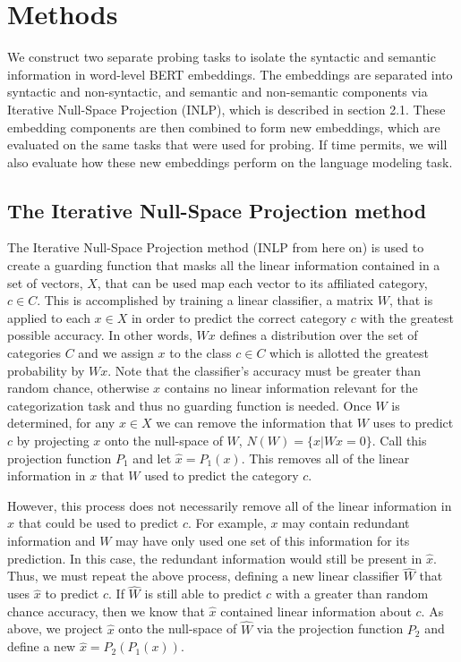 \documentclass[11pt,a4paper]{article}
\begin{document}
\section{Methods}
\label{sec:method}

We construct two separate probing tasks to isolate the syntactic and semantic information in word-level BERT embeddings\citep{bert}. The embeddings are separated into syntactic and non-syntactic, and semantic and non-semantic components via Iterative Null-Space Projection (INLP), which is described in section 2.1. These embedding components are then combined to form new embeddings, which are evaluated on the same tasks that were used for probing. If time permits, we will also evaluate how these new embeddings perform on the language modeling task. 

\subsection{The Iterative Null-Space Projection method}

The Iterative Null-Space Projection method (INLP from here on) is used to create a guarding function that masks all the linear information contained in a set of vectors, $X$, that can be used map each vector to its affiliated category, $c \in C$. This is accomplished by training a linear classifier, a matrix $W$, that is applied to each $x \in X$ in order to predict the correct category $c$ with the greatest possible accuracy. In other words, $Wx$ defines a distribution over the set of categories $C$ and we assign $x$ to the class $c \in C$ which is allotted the greatest probability by $Wx$. Note that the classifier's accuracy must be greater than random chance, otherwise $x$ contains no linear information relevant for the categorization task and thus no guarding function is needed. Once $W$ is determined, for any $x \in X$ we can remove the information that $W$ uses to predict $c$ by projecting $x$ onto the null-space of $W$, $N(W) = \{x | Wx=0\}$. Call this projection function $P_1$ and let $\hat{x} = P_1(x)$. This removes all of the linear information in $x$ that $W$ used to predict the category $c$. 

However, this process does not necessarily remove all of the linear information in $x$ that could be used to predict $c$. For example, $x$ may contain redundant information and $W$ may have only used one set of this information for its prediction. In this case, the redundant information would still be present in $\hat{x}$. Thus, we must repeat the above process, defining a new linear classifier $\hat{W}$ that uses $\hat{x}$  to predict $c$. If $\hat{W}$ is still able to predict $c$ with a greater than random chance accuracy, then we know that $\hat{x}$ contained linear information about $c$. As above, we project $\hat{x}$ onto the null-space of $\hat{W}$ via the projection function $P_2$ and define a new $\hat{x} = P_2(P_1(x))$.
\end{document}
